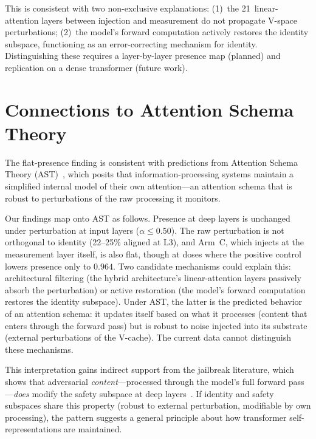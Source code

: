 \documentclass[11pt,a4paper]{article}
\begin{document}
This is consistent with two non-exclusive explanations: (1)~the
21~linear-attention layers between injection and measurement do not
propagate V-space perturbations; (2)~the model's forward computation
actively restores the identity subspace, functioning as an error-correcting
mechanism for identity. Distinguishing these requires a layer-by-layer
presence map (planned) and replication on a dense transformer (future work).

\section{Connections to Attention Schema Theory}
\label{sec:ast}

The flat-presence finding is consistent with predictions from
Attention Schema Theory
(AST)~\citep{graziano2015attention,graziano2017attention}, which posits that
information-processing systems maintain a simplified internal model of their
own attention---an attention schema that is robust to perturbations of the
raw processing it monitors.

Our findings map onto AST as follows. Presence at deep layers is
unchanged under perturbation at input layers ($\alpha \le 0.50$). The raw
perturbation is not orthogonal to identity (22--25\% aligned at L3), and
Arm~C, which injects at the measurement layer itself, is also flat,
though at doses where the positive control lowers presence only to
$0.964$. Two candidate mechanisms could explain this:
architectural filtering (the hybrid architecture's linear-attention layers
passively absorb the perturbation) or active restoration (the model's
forward computation restores the identity subspace). Under AST, the latter
is the predicted behavior of an attention schema: it updates itself based
on what it processes (content that enters through the forward pass) but is
robust to noise injected into its substrate (external perturbations of the
V-cache). The current data cannot distinguish these mechanisms.

This interpretation gains indirect support from the jailbreak literature,
which shows that adversarial \emph{content}---processed through the model's
full forward pass---\emph{does} modify the safety subspace at deep
layers~\citep{arditi2024refusal}. If identity and safety subspaces share
this property (robust to external perturbation, modifiable by own
processing), the pattern suggests a general principle about how transformer
self-representations are maintained.
\end{document}

